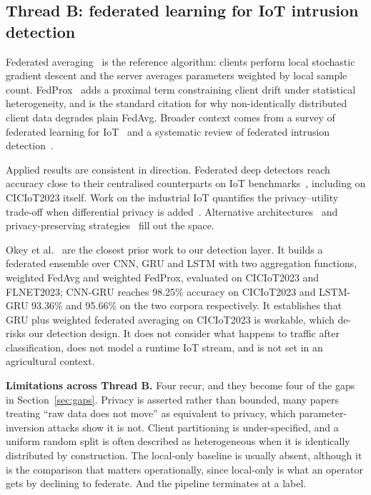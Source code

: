 \documentclass[conference]{IEEEtran}
\begin{document}
\subsection{Thread B: federated learning for IoT intrusion detection}
Federated averaging~\cite{mcmahan2017fedavg} is the reference algorithm: clients perform local
stochastic gradient descent and the server averages parameters weighted by local sample count.
FedProx~\cite{li2020fedprox} adds a proximal term constraining client drift under statistical
heterogeneity, and is the standard citation for why non-identically distributed client data
degrades plain FedAvg. Broader context comes from a survey of federated learning for
IoT~\cite{nguyen2021flsurvey} and a systematic review of federated intrusion
detection~\cite{hernandezramos2025fedidsreview}.

Applied results are consistent in direction. Federated deep detectors reach accuracy close to
their centralised counterparts on IoT
benchmarks~\cite{belarbi2023federated,karunamurthy2025optimal}, including on CICIoT2023 itself.
Work on the industrial IoT quantifies the privacy--utility trade-off when differential privacy is
added~\cite{ruzafa2021ppfl}. Alternative
architectures~\cite{abdelaziz2025tabtransformer} and privacy-preserving
strategies~\cite{khraisat2025discoveriot} fill out the space.

Okey et al.~\cite{okey2024cnngru} are the closest prior work to our detection layer. It builds a federated
ensemble over CNN, GRU and LSTM with two aggregation functions, weighted FedAvg and weighted
FedProx, evaluated on CICIoT2023 and FLNET2023; CNN-GRU reaches 98.25\% accuracy on CICIoT2023 and
LSTM-GRU 93.36\% and 95.66\% on the two corpora respectively. It establishes that GRU plus
weighted federated averaging on CICIoT2023 is workable, which de-risks our detection design. It
does not consider what happens to traffic after classification, does not model a runtime IoT
stream, and is not set in an agricultural context.

\textbf{Limitations across Thread B.} Four recur, and they become four of the gaps in
Section~\ref{sec:gaps}. Privacy is asserted rather than bounded, many papers treating ``raw data
does not move'' as equivalent to privacy, which parameter-inversion attacks show it is not.
Client partitioning is under-specified, and a uniform random split is often described as
heterogeneous when it is identically distributed by construction. The local-only baseline is
usually absent, although it is the comparison that matters operationally, since local-only is what
an operator gets by declining to federate. And the pipeline terminates at a label.
\end{document}
